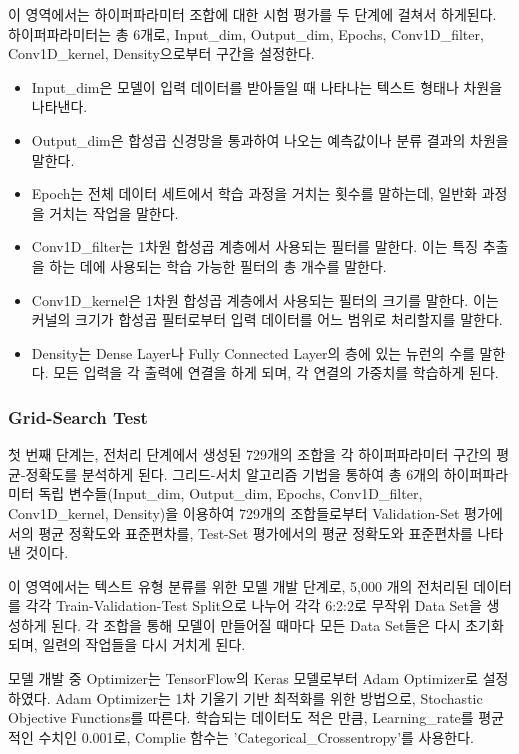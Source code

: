 \documentclass{kcc}
\begin{document}
이 영역에서는 하이퍼파라미터 조합에 대한 시험 평가를 두 단계에 걸쳐서 하게된다.
하이퍼파라미터는 총 6개로, Input\_dim, Output\_dim, Epochs, Conv1D\_filter, Conv1D\_kernel, Density으로부터 구간을 설정한다.
\begin{itemize}[itemsep=0pt,Parsep=0pt]

\item Input\_dim은 모델이 입력 데이터를 받아들일 때 나타나는 텍스트 형태나 차원을 나타낸다.
\item Output\_dim은 합성곱 신경망을 통과하여 나오는 예측값이나 분류 결과의 차원을 말한다.
\item Epoch는 전체 데이터 세트에서 학습 과정을 거치는 횟수를 말하는데, 일반화 과정을 거치는 작업을 말한다.
\item Conv1D\_filter는 1차원 합성곱 계층에서 사용되는 필터를 말한다. 이는 특징 추출\cite{cite:Convoultional}을 하는 데에 사용되는 학습 가능한 필터의 총 개수를 말한다.
\item Conv1D\_kernel은 1차원 합성곱 계층에서 사용되는 필터의 크기를 말한다. 이는 커널의 크기가 합성곱 필터로부터 입력 데이터를 어느 범위로 처리할지를 말한다.
\item Density는 Dense Layer나 Fully Connected Layer의 층에 있는 뉴런의 수를 말한다. 모든 입력을 각 출력에 연결을 하게 되며, 각 연결의 가중치를 학습하게 된다.
\end{itemize}

\subsubsection{Grid-Search Test}
첫 번째 단계는, 전처리 단계에서 생성된 729개의 조합을 각 하이퍼파라미터 구간의 평균-정확도를 분석하게 된다.
그리드-서치 알고리즘 기법을 통하여 총 6개의 하이퍼파라미터 독립 변수들(Input\_dim, Output\_dim, Epochs, Conv1D\_filter, Conv1D\_kernel, Density)을 이용하여 729개의 조합들로부터 Validation-Set 평가에서의 평균 정확도와 표준편차를, Test-Set 평가에서의 평균 정확도와 표준편차를 나타낸 것이다.

이 영역에서는 텍스트 유형 분류를 위한 모델 개발 단계로, 5,000 개의 전처리된 데이터를 각각 Train-Validation-Test Split으로 나누어 각각 6:2:2로 무작위 Data Set\cite{cite:SimpleRandeomSampling}을 생성하게 된다. 각 조합을 통해 모델이 만들어질 때마다 모든 Data Set들은 다시 초기화\cite{cite:SamplingMethods}되며, 일련의 작업들을 다시 거치게 된다.

모델 개발 중 Optimizer\cite{cite:OptimizingforCNN}는 TensorFlow의 Keras 모델로부터 Adam Optimizer로 설정하였다. Adam Optimizer는 1차 기울기 기반 최적화를 위한 방법으로, Stochastic Objective Functions\cite{cite:kingma2017adam}를 따른다. 학습되는 데이터도 적은 만큼, Learning\_rate를 평균적인 수치인 0.001로, Complie 함수는 'Categorical\_Crossentropy'를 사용한다.
\end{document}
